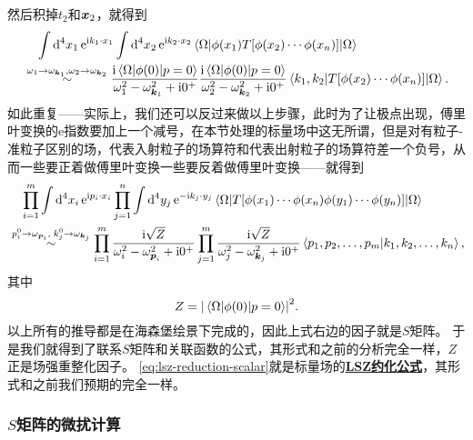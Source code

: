\documentclass[hyperref, UTF8, a4paper]{ctexart}
\newcommand*{\ii}{\mathrm{i}}
\newcommand*{\ee}{\mathrm{e}}
\newcommand{\concept}[1]{\underline{\textbf{#1}}}
\begin{document}
然后积掉$t_2$和$\vb*{x}_2$，就得到
\begin{equation}
    \begin{aligned}
        &\quad \int \dd[4]{x_1} \ee^{\ii k_1 \cdot x_1} \int \dd[4]{x_2} \ee^{\ii k_2 \cdot x_2} \mel{\Omega}{\phi(x_1) T [\phi(x_2) \cdots \phi(x_n)]}{\Omega} \\
        &\stackrel{\omega_1 \to \omega_{\vb*{k}_1}, \omega_2 \to \omega_{\vb*{k}_2}}{\sim} \frac{\ii \mel*{\Omega}{\phi(0)}{p={0}}}{\omega_1^2 - \omega_{\vb*{k}_1}^2 + \ii 0^+} \frac{\ii \mel*{\Omega}{\phi(0)}{p={0}}}{\omega_2^2 - \omega_{\vb*{k}_2}^2 + \ii 0^+} \mel*{k_1, k_2}{T [\phi(x_2) \cdots \phi(x_n)]}{\Omega}.
    \end{aligned}
    \label{eq:scalar-correlation-pole-double}
\end{equation}
如此重复——实际上，我们还可以反过来做以上步骤，此时为了让极点出现，傅里叶变换的$\ee$指数要加上一个减号，在本节处理的标量场中这无所谓，但是对有粒子-准粒子区别的场，代表入射粒子的场算符和代表出射粒子的场算符差一个负号，从而一些要正着做傅里叶变换一些要反着做傅里叶变换——就得到
\begin{equation}
    \begin{aligned}
        &\quad \prod_{i=1}^m \int \dd[4]{x_i} \ee^{\ii p_i \cdot x_i} \prod_{j=1}^n \int \dd[4]{y_j} \ee^{- \ii k_j \cdot y_j} \mel{\Omega}{T [\phi(x_1) \cdots \phi(x_n) \phi(y_1) \cdots \phi(y_n)]}{\Omega} \\
        &\stackrel{p_i^0 \to \omega_{\vb*{p}_i}, \; k_j^0 \to \omega_{\vb*{k}_j}}{\sim} \prod_{i=1}^m \frac{\ii \sqrt{Z}}{\omega_i^2 - \omega_{\vb*{p}_i}^2 + \ii 0^+} \prod_{j=1}^m \frac{\ii \sqrt{Z}}{\omega_j^2 - \omega_{\vb*{k}_j}^2 + \ii 0^+} \braket*{p_1, p_2, \ldots, p_m}{k_1, k_2, \ldots, k_n},
    \end{aligned}
    \label{eq:lsz-reduction-scalar}
\end{equation}
其中
\begin{equation}
    Z = \abs{\mel*{\Omega}{\phi(0)}{p=0}}^2.
    \label{eq:z-factor-def}
\end{equation}
以上所有的推导都是在海森堡绘景下完成的，因此上式右边的因子就是$S$矩阵。
于是我们就得到了联系$S$矩阵和关联函数的公式，其形式和之前的分析完全一样，$Z$正是场强重整化因子。%
\eqref{eq:lsz-reduction-scalar}就是标量场的\concept{LSZ约化公式}，其形式和之前我们预期的完全一样。

\subsubsection{$S$矩阵的微扰计算}
\end{document}
